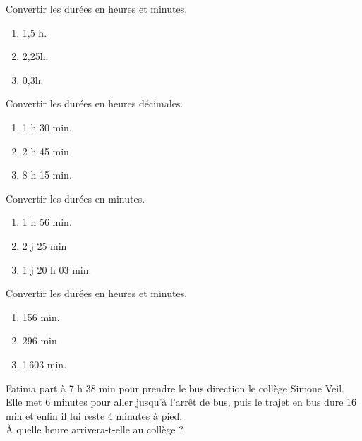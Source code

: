 \begin{colonne*exercice}


\begin{exercice}
   Convertir les durées en heures et minutes.
   \begin{enumerate}
      \item 1,5 h.
      \item 2,25h.
      \item 0,3h.
   \end{enumerate}
\end{exercice}

\begin{exercice}
   Convertir les durées en heures décimales.
   \begin{enumerate}
      \item 1 h 30 min.
      \item 2 h 45 min
      \item 8 h 15 min.
   \end{enumerate}
\end{exercice}
 
\begin{exercice}
   Convertir les durées en minutes.
   \begin{enumerate}
      \item 1 h 56 min.
      \item 2  j 25 min
      \item 1 j 20 h 03 min.
   \end{enumerate}
\end{exercice}

\begin{exercice}
   Convertir les durées en heures et minutes.
   \begin{enumerate}
      \item 156 min.
      \item 296 min
      \item 1\,603 min.
   \end{enumerate}
\end{exercice}

\begin{exercice}
   Fatima part à 7 h 38 min pour prendre le bus direction le collège Simone Veil. Elle met 6 minutes pour aller jusqu'à l'arrêt de bus, puis le trajet en bus dure 16 min et enfin il lui reste 4 minutes à pied. \\
   À quelle heure arrivera-t-elle au collège ?
\end{exercice}


\end{colonne*exercice}
